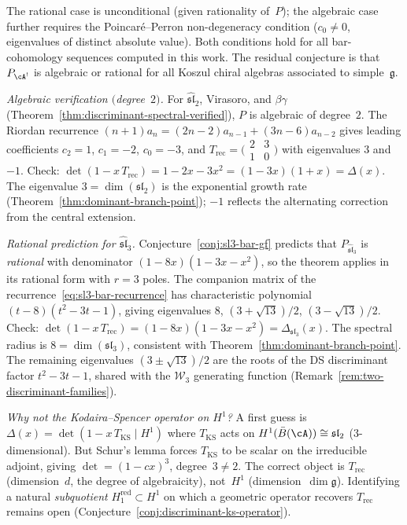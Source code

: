 \begin{remark}%
\label{rem:discriminant-spectral-scope}
The rational case is unconditional (given rationality of~$P$);
the algebraic case further requires the Poincar\'e--Perron
non-degeneracy condition ($c_0 \neq 0$, eigenvalues of distinct
absolute value). Both conditions hold for all bar-cohomology
sequences computed in this work. The residual conjecture is
that $P_{\cA^!}$ is algebraic or rational for all Koszul chiral
algebras associated to simple~$\mathfrak{g}$.

\emph{Algebraic verification $($degree~$2)$.}
For $\widehat{\mathfrak{sl}}_2$, Virasoro, and $\beta\gamma$
(Theorem~\ref{thm:discriminant-spectral-verified}), $P$ is
algebraic of degree~$2$.
The Riordan recurrence
$(n{+}1) a_n = (2n{-}2) a_{n-1} + (3n{-}6) a_{n-2}$
gives leading coefficients $c_2 = 1$, $c_1 = -2$, $c_0 = -3$,
and $T_{\mathrm{rec}} = \bigl(\begin{smallmatrix} 2 & 3 \\ 1 &
0 \end{smallmatrix}\bigr)$ with eigenvalues $3$ and $-1$.
Check: $\det(1 - x\,T_{\mathrm{rec}}) = 1 - 2x - 3x^2
= (1-3x)(1+x) = \Delta(x)$. The eigenvalue
$3 = \dim(\mathfrak{sl}_2)$ is the exponential growth rate
(Theorem~\ref{thm:dominant-branch-point});
$-1$ reflects the alternating correction from the central
extension.

\emph{Rational prediction for $\widehat{\mathfrak{sl}}_3$.}
Conjecture~\ref{conj:sl3-bar-gf} predicts that
$P_{\widehat{\mathfrak{sl}}_3}$ is \emph{rational} with
denominator $(1-8x)(1-3x-x^2)$, so the theorem applies
in its rational form with $r = 3$ poles.
The companion matrix of the recurrence~\eqref{eq:sl3-bar-recurrence}
has characteristic polynomial $(t-8)(t^2-3t-1)$, giving
eigenvalues $8$, $(3+\sqrt{13})/2$, $(3-\sqrt{13})/2$.
Check: $\det(1 - x\,T_{\mathrm{rec}})
= (1-8x)(1-3x-x^2) = \Delta_{\mathfrak{sl}_3}(x)$.
The spectral radius is $8 = \dim(\mathfrak{sl}_3)$,
consistent with Theorem~\ref{thm:dominant-branch-point}.
The remaining eigenvalues
$(3 \pm \sqrt{13})/2$ are the roots of the DS discriminant
factor $t^2 - 3t - 1$, shared with the $\mathcal{W}_3$ generating
function (Remark~\ref{rem:two-discriminant-families}).

\emph{Why not the Kodaira--Spencer operator on $H^1$?}
A first guess is
$\Delta(x) = \det(1 - x\, T_{\mathrm{KS}} \mid H^1)$
where $T_{\mathrm{KS}}$ acts on
$H^1(\bar{B}(\cA)) \cong \mathfrak{sl}_2$ ($3$-dimensional).
But Schur's lemma forces $T_{\mathrm{KS}}$ to be scalar on the
irreducible adjoint, giving $\det = (1-cx)^3$, degree~$3 \neq 2$.
The correct object is $T_{\mathrm{rec}}$ (dimension~$d$, the
degree of algebraicity), not~$H^1$ (dimension~$\dim\mathfrak{g}$).
Identifying a natural \emph{subquotient} $H^{\mathrm{red}}_1
\subset H^1$ on which a geometric operator recovers
$T_{\mathrm{rec}}$ remains open
(Conjecture~\ref{conj:discriminant-ks-operator}).


\end{remark}

